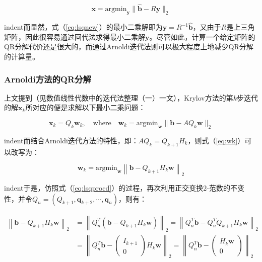 \documentclass[UTF8,nofonts]{ctexart}
\begin{document}
\begin{equation}
\label{eq:lsqnew}
\boldsymbol{x}=\text{argmin}_{\boldsymbol{y}}\|\hat{\boldsymbol{b}}-R\boldsymbol{y}\|_2
\end{equation}

indent而显然，式（\ref{eq:lsqnew}）的最小二乘解即为$\boldsymbol{y}=R^{-1}\hat{\boldsymbol{b}}$，又由于$R$是上三角矩阵，因此很容易通过回代法求得最小二乘解$\boldsymbol{y}$。尽管如此，计算一个给定矩阵的QR分解代价还是很大的，而通过Arnoldi迭代法则可以极大程度上地减少QR分解的计算量。

\subsubsection*{Arnoldi方法的QR分解}

上文提到（见数值线性代数中的迭代法整理（一）一文），Krylov方法的第$k$步迭代的解$\boldsymbol{x}_k$所对应的便是求解以下最小二乘问题：

\begin{equation}
\label{eq:wk}
\boldsymbol{x}_k=Q_k\boldsymbol{w}_k,\quad\text{where}\quad\boldsymbol{w}_k=\text{argmin}_{\boldsymbol{w}}\|\boldsymbol{b}-AQ_k\boldsymbol{w}\|_2
\end{equation}

indent而结合Arnoldi迭代方法的特性，即：$AQ_k=Q_{k+1}H_{k}$，则式（\ref{eq:wk}）可以改写为：

\begin{equation}
\label{eq:wknew}
\boldsymbol{w}_k=\text{argmin}_{\boldsymbol{w}}\left\|\boldsymbol{b}-Q_{k+1}H_k\boldsymbol{w}\right\|_2
\end{equation}

indent于是，仿照式（\ref{eq:lsqprocd}）的过程，再次利用正交变换$2$-范数的不变性，并令$Q_n=\left(Q_{k+1},\boldsymbol{q}_{k+2},\cdots,\boldsymbol{q}_n\right)$，则有：

\[
\begin{aligned}
\left\|\boldsymbol{b}-Q_{k+1}H_k\boldsymbol{w}\right\|_2 &=
\left\|Q_n^T(\boldsymbol{b}-Q_{k+1}H_k\boldsymbol{w})\right\|_2=
\left\|Q_n^T\boldsymbol{b}-Q_n^TQ_{k+1}H_k\boldsymbol{w}\right\|_2 \\ &=
\left\|Q_n^T\boldsymbol{b}-\begin{pmatrix}I_{k+1}\\0\end{pmatrix}H_k\boldsymbol{w}\right\|_2=
\left\|Q_n^T\boldsymbol{b}-\begin{pmatrix}H_k\boldsymbol{w}\\0\end{pmatrix}\right\|_2
\end{aligned}
\]
\end{document}
